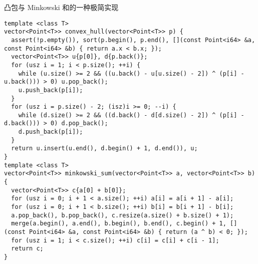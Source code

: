 凸包与 Minkowski 和的一种极简实现

\begin{verbatim}
template <class T>
vector<Point<T>> convex_hull(vector<Point<T>> p) {
  assert(!p.empty()), sort(p.begin(), p.end(), [](const Point<i64> &a, const Point<i64> &b) { return a.x < b.x; });
  vector<Point<T>> u{p[0]}, d{p.back()};
  for (usz i = 1; i < p.size(); ++i) {
    while (u.size() >= 2 && ((u.back() - u[u.size() - 2]) ^ (p[i] - u.back())) > 0) u.pop_back();
    u.push_back(p[i]);
  }
  for (usz i = p.size() - 2; (isz)i >= 0; --i) {
    while (d.size() >= 2 && ((d.back() - d[d.size() - 2]) ^ (p[i] - d.back())) > 0) d.pop_back();
    d.push_back(p[i]);
  }
  return u.insert(u.end(), d.begin() + 1, d.end()), u;
}
template <class T>
vector<Point<T>> minkowski_sum(vector<Point<T>> a, vector<Point<T>> b) {
  vector<Point<T>> c{a[0] + b[0]};
  for (usz i = 0; i + 1 < a.size(); ++i) a[i] = a[i + 1] - a[i];
  for (usz i = 0; i + 1 < b.size(); ++i) b[i] = b[i + 1] - b[i];
  a.pop_back(), b.pop_back(), c.resize(a.size() + b.size() + 1);
  merge(a.begin(), a.end(), b.begin(), b.end(), c.begin() + 1, [](const Point<i64> &a, const Point<i64> &b) { return (a ^ b) < 0; });
  for (usz i = 1; i < c.size(); ++i) c[i] = c[i] + c[i - 1];
  return c;
}
\end{verbatim}